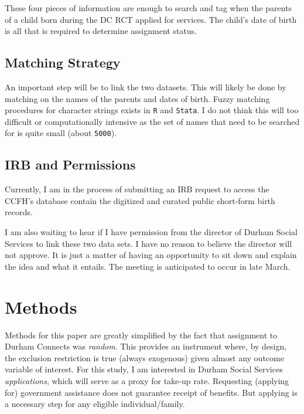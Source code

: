 \documentclass[12pt,letterpaperpaper,]{book}
\begin{document}
These four pieces of information are enough to search and tag when the
parents of a child born during the DC RCT applied for services. The
child's date of birth is all that is required to determine assignment
status.

\subsection*{Matching Strategy}\label{matching-strategy}

An important step will be to link the two datasets. This will likely be
done by matching on the names of the parents and dates of birth. Fuzzy
matching procedures for character strings exists in \texttt{R} and
\texttt{Stata}. I do not think this will too difficult or
computationally intensive as the set of names that need to be searched
for is quite small (about \texttt{5000}).

\subsection*{IRB and Permissions}\label{irb-and-permissions}

Currently, I am in the process of submitting an IRB request to access
the CCFH's database contain the digitized and curated public short-form
birth records.

I am also waiting to hear if I have permission from the director of
Durham Social Services to link these two data sets. I have no reason to
believe the director will not approve. It is just a matter of having an
opportunity to sit down and explain the idea and what it entails. The
meeting is anticipated to occur in late March.

\section*{Methods}\label{methods-2}

Methods for this paper are greatly simplified by the fact that
assignment to Durham Connects was \emph{random}. This provides an
instrument where, by design, the exclusion restriction is true (always
exogenous) given almost any outcome variable of interest. For this
study, I am interested in Durham Social Services \emph{applications},
which will serve as a proxy for take-up rate. Requesting (applying for)
government assistance does not guarantee receipt of benefits. But
applying is a necessary step for any eligible individual/family.
\end{document}
